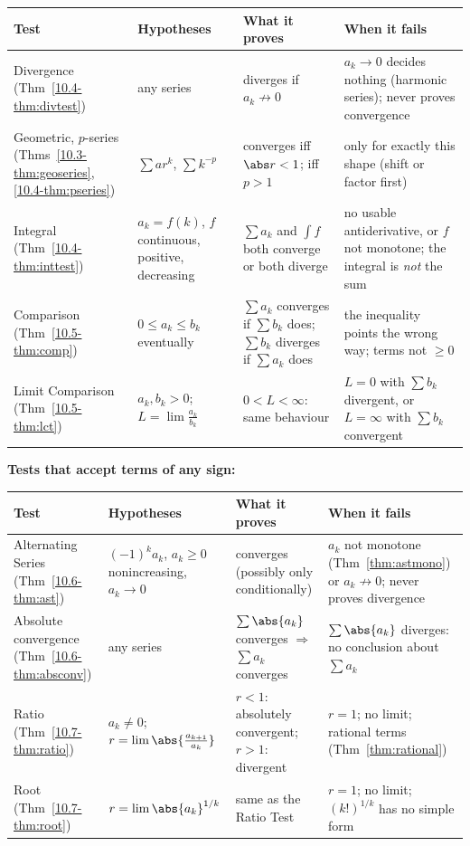 \documentclass[11pt]{article}
\begin{document}
\begingroup\small\setlength{\tabcolsep}{3pt}\renewcommand{\arraystretch}{1.2}
\noindent\begin{tabular}{@{}>{\raggedright\arraybackslash}p{1.25in}>{\raggedright\arraybackslash}p{1.45in}>{\raggedright\arraybackslash}p{1.5in}>{\raggedright\arraybackslash}p{1.75in}@{}}\toprule
\textbf{Test} & \textbf{Hypotheses} & \textbf{What it proves} & \textbf{When it fails}\\\midrule
Divergence (Thm~\ref{10.4-thm:divtest}) & any series & diverges if $a_k\not\to0$ & $a_k\to0$ decides nothing (harmonic series); never proves convergence\\
Geometric, $p$-series (Thms~\ref{10.3-thm:geoseries}, \ref{10.4-thm:pseries}) & $\sum ar^k$, $\sum k^{-p}$ & converges iff $\abs r<1$; iff $p>1$ & only for exactly this shape (shift or factor first)\\
Integral (Thm~\ref{10.4-thm:inttest}) & $a_k=f(k)$, $f$ continuous, positive, decreasing & $\sum a_k$ and $\int f$ both converge or both diverge & no usable antiderivative, or $f$ not monotone; the integral is \emph{not} the sum\\
Comparison (Thm~\ref{10.5-thm:comp}) & $0\le a_k\le b_k$ eventually & $\sum a_k$ converges if $\sum b_k$ does; $\sum b_k$ diverges if $\sum a_k$ does & the inequality points the wrong way; terms not $\ge0$\\
Limit Comparison (Thm~\ref{10.5-thm:lct}) & $a_k,b_k>0$; $L=\lim\frac{a_k}{b_k}$ & $0<L<\infty$: same behaviour & $L=0$ with $\sum b_k$ divergent, or $L=\infty$ with $\sum b_k$ convergent\\\bottomrule
\end{tabular}
\endgroup

\textbf{Tests that accept terms of any sign:}\par\nopagebreak
\begingroup\small\setlength{\tabcolsep}{3pt}\renewcommand{\arraystretch}{1.2}
\noindent\begin{tabular}{@{}>{\raggedright\arraybackslash}p{1.25in}>{\raggedright\arraybackslash}p{1.45in}>{\raggedright\arraybackslash}p{1.5in}>{\raggedright\arraybackslash}p{1.75in}@{}}\toprule
\textbf{Test} & \textbf{Hypotheses} & \textbf{What it proves} & \textbf{When it fails}\\\midrule
Alternating Series (Thm~\ref{10.6-thm:ast}) & $(-1)^ka_k$, $a_k\ge0$ nonincreasing, $a_k\to0$ & converges (possibly only conditionally) & $a_k$ not monotone (Thm~\ref{thm:astmono}) or $a_k\not\to0$; never proves divergence\\
Absolute convergence (Thm~\ref{10.6-thm:absconv}) & any series & $\sum\abs{a_k}$ converges $\Rightarrow$ $\sum a_k$ converges & $\sum\abs{a_k}$ diverges: no conclusion about $\sum a_k$\\
Ratio (Thm~\ref{10.7-thm:ratio}) & $a_k\ne0$; $r=\lim\abs{\frac{a_{k+1}}{a_k}}$ & $r<1$: absolutely convergent; $r>1$: divergent & $r=1$; no limit; rational terms (Thm~\ref{thm:rational})\\
Root (Thm~\ref{10.7-thm:root}) & $r=\lim\abs{a_k}^{1/k}$ & same as the Ratio Test & $r=1$; no limit; $(k!)^{1/k}$ has no simple form\\\bottomrule
\end{tabular}
\endgroup
\end{document}
